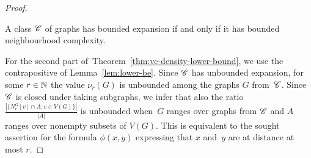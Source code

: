 \begin{proof}
\begin{lemma}\label{lem:lower-be}
A class $\mathscr{C}$ of graphs has bounded expansion if and only if 
it has bounded neighbourhood complexity.
\end{lemma}

For the second part of~Theorem~\ref{thm:vc-density-lower-bound}, we use the contrapositive of Lemma~\ref{lem:lower-be}. Since $\mathscr{C}$ has unbounded expansion, for some $r\in \mathbb{N}$ 
the value $\nu_r(G)$ is unbounded among the graphs $G$ 
from~$\mathscr{C}$.
Since $\mathscr{C}$ is closed under taking subgraphs, we infer that also the ratio 
$\frac{|\{N_r^G[v]\cap A \colon v\in V(G)\}|}{|A|}$ is unbounded when~$G$ ranges over graphs from $\mathscr{C}$ and $A$ ranges over nonempty subsets of $V(G)$.
This is equivalent to the sought assertion for the formula $\phi(x,y)$ expressing that $x$ and~$y$ are at distance at most $r$. 
\end{proof}

